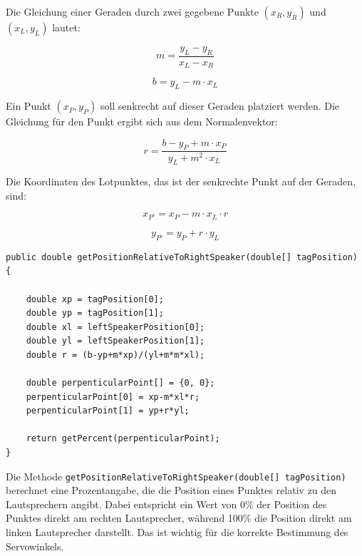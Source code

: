 Die Gleichung einer Geraden durch zwei gegebene Punkte \( (x_R, y_R) \) und \( (x_L, y_L) \) lautet:

\begin{equation*}
	m = \frac{y_L - y_R}{x_L - x_R}
\end{equation*}

\begin{equation*}
	b = y_L - m \cdot x_L
\end{equation*}

Ein Punkt \( (x_P, y_P) \) soll senkrecht auf dieser Geraden platziert werden. Die Gleichung für den Punkt ergibt sich aus dem Normalenvektor:

\begin{equation*}
	r = \frac{b - y_P + m \cdot x_P}{y_L + m^2 \cdot x_L}
\end{equation*}

Die Koordinaten des Lotpunktes, das ist der senkrechte Punkt auf der Geraden, sind:

\begin{equation*}
	x_{P'} = x_P - m \cdot x_L \cdot r
\end{equation*}

\begin{equation*}
	y_{P'} = y_P + r \cdot y_L
\end{equation*}

\begin{lstlisting}[style=Java, caption=Auszug aus EqualizerSettingCalculator.java, captionpos=b]
public double getPositionRelativeToRightSpeaker(double[] tagPosition) {
	
	double xp = tagPosition[0];
	double yp = tagPosition[1];
	double xl = leftSpeakerPosition[0];
	double yl = leftSpeakerPosition[1];
	double r = (b-yp+m*xp)/(yl+m*m*xl);
	
	double perpenticularPoint[] = {0, 0};
	perpenticularPoint[0] = xp-m*xl*r;
	perpenticularPoint[1] = yp+r*yl;
	
	return getPercent(perpenticularPoint);
}
\end{lstlisting}

Die Methode \texttt{getPositionRelativeToRightSpeaker(double[] tagPosition)} berechnet eine Prozentangabe, die die Position eines Punktes relativ zu den Lautsprechern angibt. Dabei entspricht ein Wert von 0\% der Position des Punktes direkt am rechten Lautsprecher, während 100\% die Position direkt am linken Lautsprecher darstellt. Das ist wichtig für die korrekte Bestimmung des Servowinkels.


\newpage
